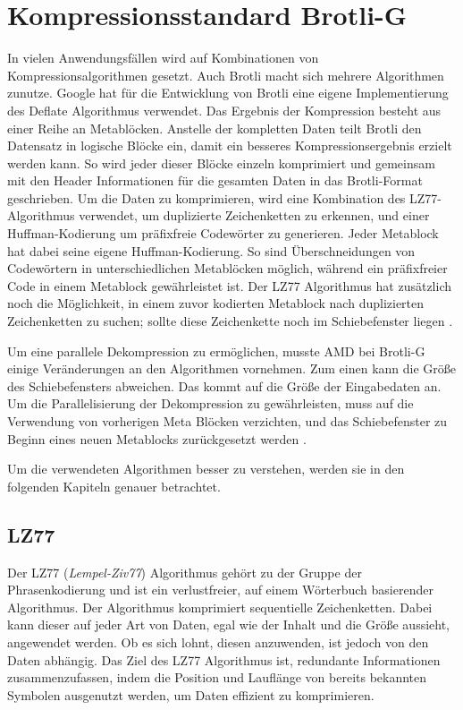\section{Kompressionsstandard Brotli-G}
\label{sec:brotlig}
In vielen Anwendungsfällen wird auf Kombinationen von Kompressionsalgorithmen gesetzt.
Auch Brotli macht sich mehrere Algorithmen zunutze.
Google hat für die Entwicklung von Brotli eine eigene Implementierung des Deflate Algorithmus verwendet.
Das Ergebnis der Kompression besteht aus einer Reihe an Metablöcken.
Anstelle der kompletten Daten teilt Brotli den Datensatz in logische Blöcke ein, damit ein besseres Kompressionsergebnis erzielt werden kann.
So wird jeder dieser Blöcke einzeln komprimiert und gemeinsam mit den Header Informationen für die gesamten Daten in das Brotli-Format geschrieben.
Um die Daten zu komprimieren, wird eine Kombination des LZ77-Algorithmus verwendet, um duplizierte Zeichenketten zu erkennen, und einer Huffman-Kodierung um präfixfreie Codewörter zu generieren.
Jeder Metablock hat dabei seine eigene Huffman-Kodierung.
So sind Überschneidungen von Codewörtern in unterschiedlichen Metablöcken möglich, während ein präfixfreier Code in einem Metablock gewährleistet ist.
Der LZ77 Algorithmus hat zusätzlich noch die Möglichkeit, in einem zuvor kodierten Metablock nach duplizierten Zeichenketten zu suchen; sollte diese Zeichenkette noch im Schiebefenster liegen \cite{rfc7932}. \newline

Um eine parallele Dekompression zu ermöglichen, musste AMD bei Brotli-G einige Veränderungen an den Algorithmen vornehmen.
Zum einen kann die Größe des Schiebefensters abweichen.
Das kommt auf die Größe der Eingabedaten an.
Um die Parallelisierung der Dekompression zu gewährleisten, muss auf die Verwendung von vorherigen Meta Blöcken verzichten, und das Schiebefenster zu Beginn eines neuen Metablocks zurückgesetzt werden \cite{AMD2024}. \newline

Um die verwendeten Algorithmen besser zu verstehen, werden sie in den folgenden Kapiteln genauer betrachtet.

\subsection{LZ77}
\label{subsubsec:lz77}
Der LZ77 (\textit{Lempel-Ziv77}) Algorithmus gehört zu der Gruppe der Phrasenkodierung und ist ein verlustfreier, auf einem Wörterbuch basierender Algorithmus.
Der Algorithmus komprimiert sequentielle Zeichenketten.
Dabei kann dieser auf jeder Art von Daten, egal wie der Inhalt und die Größe aussieht, angewendet werden.
Ob es sich lohnt, diesen anzuwenden, ist jedoch von den Daten abhängig.
Das Ziel des LZ77 Algorithmus ist, redundante Informationen zusammenzufassen, indem die Position und Lauflänge von bereits bekannten Symbolen ausgenutzt werden, um Daten effizient zu komprimieren. \newline

